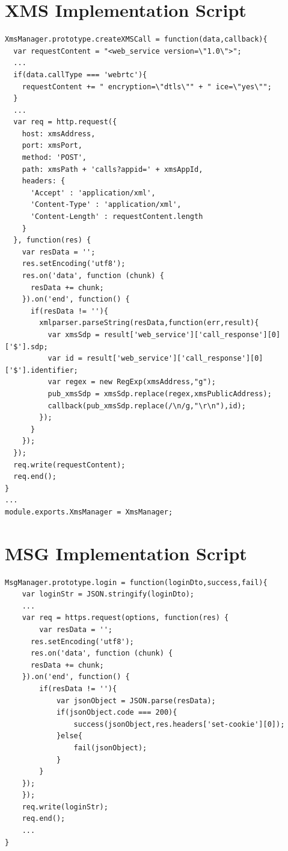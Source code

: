 \begin{appendices}
\section{XMS Implementation Script}
\label{server:xms}

\begin{lstlisting}[caption={xms.js on Application Server},label={code:xms}]
XmsManager.prototype.createXMSCall = function(data,callback){
  var requestContent = "<web_service version=\"1.0\">";
  ...
  if(data.callType === 'webrtc'){
    requestContent += " encryption=\"dtls\"" + " ice=\"yes\"";
  }
  ...
  var req = http.request({
    host: xmsAddress,
    port: xmsPort,
    method: 'POST',
    path: xmsPath + 'calls?appid=' + xmsAppId,
    headers: {
      'Accept' : 'application/xml',
      'Content-Type' : 'application/xml',
      'Content-Length' : requestContent.length
    }
  }, function(res) {
    var resData = '';
    res.setEncoding('utf8');
    res.on('data', function (chunk) {
      resData += chunk;
    }).on('end', function() {
      if(resData != ''){
        xmlparser.parseString(resData,function(err,result){
          var xmsSdp = result['web_service']['call_response'][0]['$'].sdp;
          var id = result['web_service']['call_response'][0]['$'].identifier;
          var regex = new RegExp(xmsAddress,"g");
          pub_xmsSdp = xmsSdp.replace(regex,xmsPublicAddress);
          callback(pub_xmsSdp.replace(/\n/g,"\r\n"),id);
        });
      }
    });
  });
  req.write(requestContent);
  req.end();
}
...
module.exports.XmsManager = XmsManager;
\end{lstlisting}

\section{MSG Implementation Script}
\label{server:msg}

\begin{lstlisting}[caption={msg.js on Application Server},label={code:msg}]
MsgManager.prototype.login = function(loginDto,success,fail){
	var loginStr = JSON.stringify(loginDto);
	...
	var req = https.request(options, function(res) {
		var resData = '';
	  res.setEncoding('utf8');
	  res.on('data', function (chunk) {
      resData += chunk;
    }).on('end', function() {
    	if(resData != ''){
    		var jsonObject = JSON.parse(resData);
    		if(jsonObject.code === 200){
    			success(jsonObject,res.headers['set-cookie'][0]);
    		}else{
    			fail(jsonObject);
    		}
    	}
    });
	});
	req.write(loginStr);
	req.end();
	...
}


\end{lstlisting}
\end{appendices}

